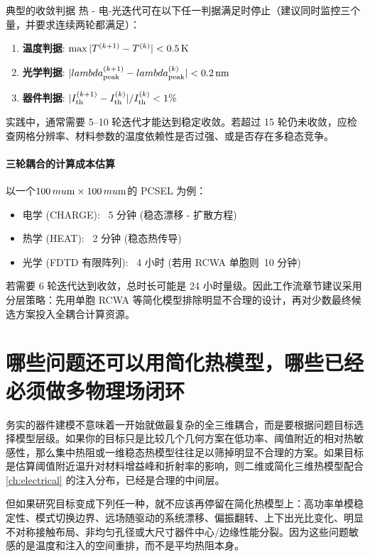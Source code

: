 \begin{ConvergenceCriteria}{典型的收敛判据}
热 - 电-光迭代可在以下任一判据满足时停止（建议同时监控三个量，并要求连续两轮都满足）：
\begin{enumerate}
  \item \textbf{温度判据}: $\max|T^{(k+1)}-T^{(k)}| < 0.5\,{\rm K}$
  \item \textbf{光学判据}: $|\lambda_{\rm peak}^{(k+1)}-\lambda_{\rm peak}^{(k)}| < 0.2\,{\rm nm}$
  \item \textbf{器件判据}: $|I_{\rm th}^{(k+1)}-I_{\rm th}^{(k)}|/I_{\rm th}^{(k)} < 1\%$
\end{enumerate}
实践中，通常需要 5--10 轮迭代才能达到稳定收敛。若超过 15 轮仍未收敛，应检查网格分辨率、材料参数的温度依赖性是否过强、或是否存在多稳态竞争。
\end{ConvergenceCriteria}

\paragraph{三轮耦合的计算成本估算}以一个$100\,\mu{\rm m}\times100\,\mu{\rm m}$的 PCSEL 为例：
\begin{itemize}
  \item 电学 (CHARGE): ~5 分钟 (稳态漂移 - 扩散方程)
  \item 热学 (HEAT): ~2 分钟 (稳态热传导)
  \item 光学 (FDTD 有限阵列): ~4 小时 (若用 RCWA 单胞则~10 分钟)
\end{itemize}
若需要 6 轮迭代达到收敛，总时长可能是 24 小时量级。因此工作流章节建议采用分层策略：先用单胞 RCWA 等简化模型排除明显不合理的设计，再对少数最终候选方案投入全耦合计算资源。

\section{哪些问题还可以用简化热模型，哪些已经必须做多物理场闭环}
务实的器件建模不意味着一开始就做最复杂的全三维耦合，而是要根据问题目标选择模型层级。如果你的目标只是比较几个几何方案在低功率、阈值附近的相对热敏感性，那么集中热阻或一维稳态热模型往往足以筛掉明显不合理的方案。如果目标是估算阈值附近温升对材料增益峰和折射率的影响，则二维或简化三维热模型配合 \cref{ch:electrical} 的注入分布，已经是合理的中间层。

但如果研究目标变成下列任一种，就不应该再停留在简化热模型上：高功率单模稳定性、模式切换边界、远场随驱动的系统漂移、偏振翻转、上下出光比变化、明显不对称接触布局、非均匀孔径或大尺寸器件中心/边缘性能分裂。因为这些问题敏感的是温度和注入的空间重排，而不是平均热阻本身。

